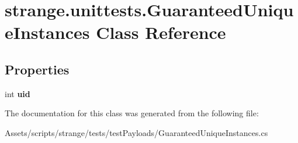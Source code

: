 \hypertarget{classstrange_1_1unittests_1_1_guaranteed_unique_instances}{\section{strange.\-unittests.\-Guaranteed\-Unique\-Instances Class Reference}
\label{classstrange_1_1unittests_1_1_guaranteed_unique_instances}
}
\subsection*{Properties}
\begin{DoxyCompactItemize}
\item 
\hypertarget{classstrange_1_1unittests_1_1_guaranteed_unique_instances_a50912264a8bda65feb15da1fe8193493}{int {\bfseries uid}}\label{classstrange_1_1unittests_1_1_guaranteed_unique_instances_a50912264a8bda65feb15da1fe8193493}

\end{DoxyCompactItemize}


The documentation for this class was generated from the following file\-:\begin{DoxyCompactItemize}
\item 
Assets/scripts/strange/tests/test\-Payloads/Guaranteed\-Unique\-Instances.\-cs\end{DoxyCompactItemize}
